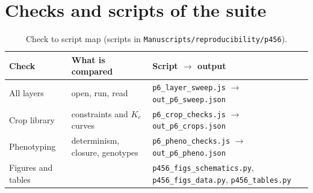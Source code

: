 \documentclass[preprint,12pt]{elsarticle}
\begin{document}
\section{Checks and scripts of the suite}\label{app:repro6}
\begin{table}[H]\centering\small
\caption{Check to script map (scripts in \texttt{Manuscripts/reproducibility/p456}).}
\begin{tabularx}{\textwidth}{>{\raggedright\arraybackslash}p{4.2cm}>{\raggedright\arraybackslash}p{4.0cm}X}
\toprule Check & What is compared & Script $\to$ output\\\midrule
All layers & open, run, read & \texttt{p6\_layer\_sweep.js} $\to$ \texttt{out\_p6\_sweep.json}\\
Crop library & constraints and $K_c$ curves & \texttt{p6\_crop\_checks.js} $\to$ \texttt{out\_p6\_crops.json}\\
Phenotyping & determinism, closure, genotypes & \texttt{p6\_pheno\_checks.js} $\to$ \texttt{out\_p6\_pheno.json}\\
Figures and tables & & \texttt{p456\_figs\_schematics.py}, \texttt{p456\_figs\_data.py}, \texttt{p456\_tables.py}\\\bottomrule
\end{tabularx}
\end{table}



\end{document}
